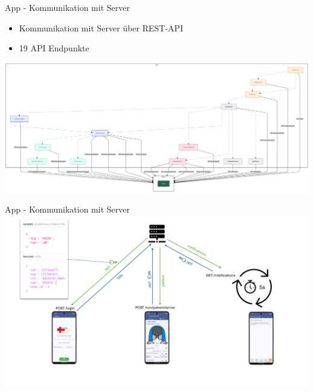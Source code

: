 \begin{frame}{App - Kommunikation mit Server}
	\begin{itemize}
		\item Kommunikation mit Server über REST-API
		\item 19 API Endpunkte
	\end{itemize}
	\centering
	\includegraphics[width=1.0\textwidth]{images/app/server_endpoints.png}
\end{frame}

\begin{frame}{App - Kommunikation mit Server}
	\centering
	\includegraphics[width=1.0\textwidth]{images/app/api_flow.png}
\end{frame}

